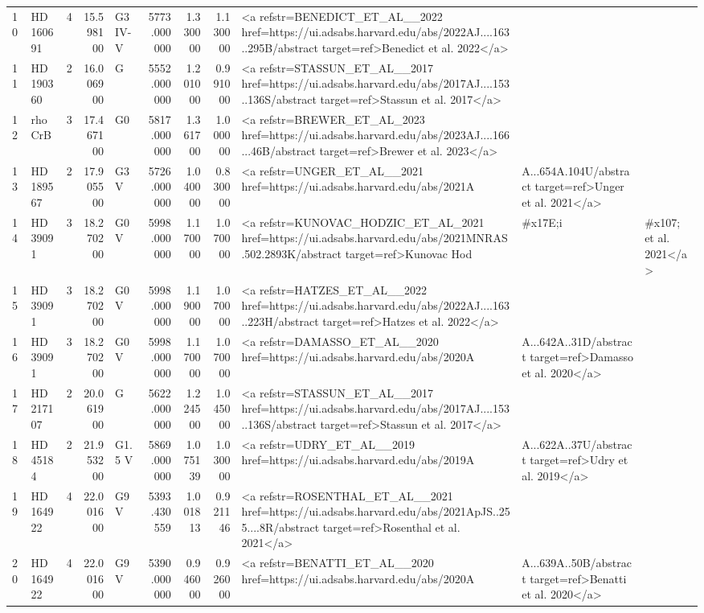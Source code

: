 \begin{tabular}{llrrlrrrl}
10 & HD 160691 & 4 & 15.598100 & G3 IV-V & 5773.000000 & 1.330000 & 1.130000 & <a refstr=BENEDICT_ET_AL__2022 href=https://ui.adsabs.harvard.edu/abs/2022AJ....163..295B/abstract target=ref>Benedict et al. 2022</a> \\
11 & HD 190360 & 2 & 16.006900 & G & 5552.000000 & 1.201000 & 0.991000 & <a refstr=STASSUN_ET_AL__2017 href=https://ui.adsabs.harvard.edu/abs/2017AJ....153..136S/abstract target=ref>Stassun et al. 2017</a> \\
12 & rho CrB & 3 & 17.467100 & G0 & 5817.000000 & 1.361700 & 1.000000 & <a refstr=BREWER_ET_AL_2023 href=https://ui.adsabs.harvard.edu/abs/2023AJ....166...46B/abstract target=ref>Brewer et al. 2023</a> \\
13 & HD 189567 & 2 & 17.905500 & G3 V & 5726.000000 & 1.040000 & 0.830000 & <a refstr=UNGER_ET_AL__2021 href=https://ui.adsabs.harvard.edu/abs/2021A&A...654A.104U/abstract target=ref>Unger et al. 2021</a> \\
14 & HD 39091 & 3 & 18.270200 & G0 V & 5998.000000 & 1.170000 & 1.070000 & <a refstr=KUNOVAC_HODZIC_ET_AL_2021 href=https://ui.adsabs.harvard.edu/abs/2021MNRAS.502.2893K/abstract target=ref>Kunovac Hod&#x17E;i&#x107; et al. 2021</a> \\
15 & HD 39091 & 3 & 18.270200 & G0 V & 5998.000000 & 1.190000 & 1.070000 & <a refstr=HATZES_ET_AL__2022 href=https://ui.adsabs.harvard.edu/abs/2022AJ....163..223H/abstract target=ref>Hatzes et al. 2022</a> \\
16 & HD 39091 & 3 & 18.270200 & G0 V & 5998.000000 & 1.170000 & 1.070000 & <a refstr=DAMASSO_ET_AL__2020 href=https://ui.adsabs.harvard.edu/abs/2020A&A...642A..31D/abstract target=ref>Damasso et al. 2020</a> \\
17 & HD 217107 & 2 & 20.061900 & G & 5622.000000 & 1.224500 & 1.045000 & <a refstr=STASSUN_ET_AL__2017 href=https://ui.adsabs.harvard.edu/abs/2017AJ....153..136S/abstract target=ref>Stassun et al. 2017</a> \\
18 & HD 45184 & 2 & 21.953200 & G1.5 V & 5869.000000 & 1.075139 & 1.030000 & <a refstr=UDRY_ET_AL__2019 href=https://ui.adsabs.harvard.edu/abs/2019A&A...622A..37U/abstract target=ref>Udry et al. 2019</a> \\
19 & HD 164922 & 4 & 22.001600 & G9 V & 5393.430559 & 1.001813 & 0.921146 & <a refstr=ROSENTHAL_ET_AL__2021 href=https://ui.adsabs.harvard.edu/abs/2021ApJS..255....8R/abstract target=ref>Rosenthal et al. 2021</a> \\
20 & HD 164922 & 4 & 22.001600 & G9 V & 5390.000000 & 0.946000 & 0.926000 & <a refstr=BENATTI_ET_AL__2020 href=https://ui.adsabs.harvard.edu/abs/2020A&A...639A..50B/abstract target=ref>Benatti et al. 2020</a> \\

\end{tabular}
